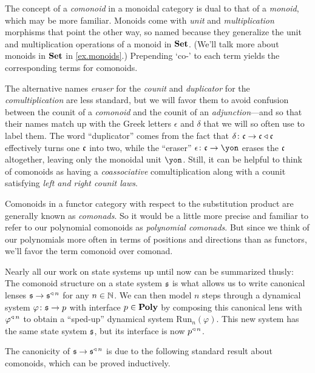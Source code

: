 \documentclass[Book-Poly]{subfiles}
\begin{document}
\begin{remark}
The concept of a \emph{comonoid} in a monoidal category is dual to that of a \emph{monoid}, which may be more familiar.
Monoids come with \emph{unit} and \emph{multiplication} morphisms that point the other way, so named because they generalize the unit and multiplication operations of a monoid in $\mathbf{Set}$.
(We'll talk more about monoids in $\mathbf{Set}$ in \cref{ex.monoids}.)
Prepending `co-' to each term yields the corresponding terms for comonoids.

The alternative names \emph{eraser} for the \emph{counit} and \emph{duplicator} for the \emph{comultiplication} are less standard, but we will favor them to avoid confusion between the counit of a \emph{comonoid} and the counit of an \emph{adjunction}---and so that their names match up with the Greek letters $\epsilon$ and $\delta$ that we will so often use to label them.
The word ``duplicator'' comes from the fact that $\delta\colon\mathfrak{c}\to\mathfrak{c}\mathbin{\triangleleft}\mathfrak{c}$ effectively turns one $\mathfrak{c}$ into two, while the ``eraser'' $\epsilon\colon\car{c}\to\yon$ erases the $\mathfrak{c}$ altogether, leaving only the monoidal unit $\yon$.
Still, it can be helpful to think of comonoids as having a \emph{coassociative} comultiplication along with a counit satisfying \emph{left and right counit laws}.
\end{remark}

\begin{remark}
Comonoids in a functor category with respect to the substitution product are generally known as \emph{comonads}.
So it would be a little more precise and familiar to refer to our polynomial comonoids as \emph{polynomial comonads}.
But since we think of our polynomials more often in terms of positions and directions than as functors, we’ll favor the term comonoid over comonad.
\end{remark}

\begin{example}
Nearly all our work on state systems up until now can be summarized thusly:
The comonoid structure on a state system $\mathfrak{s}$ is what allows us to write canonical lenses $\mathfrak{s}\to\mathfrak{s}^{\mathbin{\triangleleft}\,n}$ for any $n\in\mathbb{N}$.
We can then model $n$ steps through a dynamical system $\varphi\colon\mathfrak{s}\to p$ with interface $p\in\mathbf{Poly}$ by composing this canonical lens with $\varphi^{\mathbin{\triangleleft}\,n}$ to obtain a ``sped-up'' dynamical system $\text{Run}_n(\varphi)$.
This new system has the same state system $\mathfrak{s}$, but its interface is now $p^{\mathbin{\triangleleft}\,n}$.

The canonicity of $\mathfrak{s}\to\mathfrak{s}^{\mathbin{\triangleleft}\,n}$ is due to the following standard result about comonoids, which can be proved inductively.
\end{example}
\end{document}
